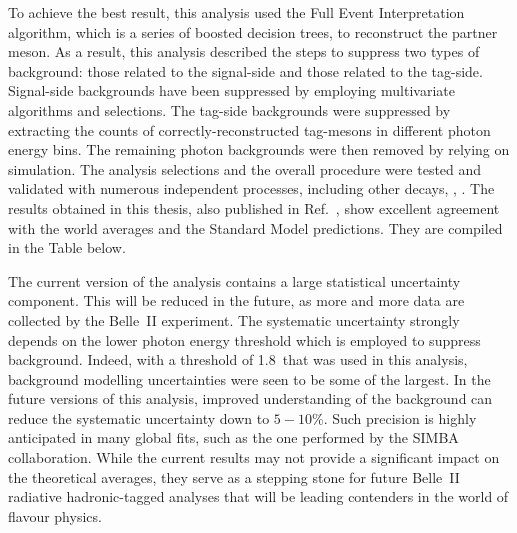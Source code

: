 To achieve the best result, this \BtoXsgamma analysis used the Full Event Interpretation algorithm, which is a series of boosted decision trees, to reconstruct the partner \B meson.
As a result, this analysis described the steps to suppress two types of background: those related to the signal-side and those related to the tag-side.
Signal-side backgrounds have been suppressed by employing multivariate algorithms and selections.
The tag-side backgrounds were suppressed by extracting the counts of correctly-reconstructed tag-\B mesons in different photon energy bins.
The remaining photon backgrounds were then removed by relying on simulation.
The analysis selections and the overall procedure were tested and validated with numerous independent processes, including other \B decays, \mbox{\epem\ra\qqbar}, \mbox{\epem\ra\mumu}.
The results obtained in this thesis, also published in Ref.~\cite{Belle-II:2022hys}, show excellent agreement with the world averages and the Standard Model predictions.
They are compiled in the Table below.
\begin{table}[hbtp!]
\end{table}

The current version of the analysis contains a large statistical uncertainty component. 
This will be reduced in the future, as more and more data are collected by the Belle~II experiment.
The systematic uncertainty strongly depends on the lower photon energy threshold which is employed to suppress background.
Indeed, with a threshold of 1.8~\gev that was used in this analysis, background modelling uncertainties were seen to be some of the largest.
In the future versions of this analysis, improved understanding of the background can reduce the systematic uncertainty down to $5-10\%$.
Such precision is highly anticipated in many global fits, such as the one performed by the SIMBA collaboration.
While the current results may not provide a significant impact on the theoretical averages, they serve as a stepping stone for future Belle~II radiative hadronic-tagged analyses that will be leading contenders in the world of flavour physics.






